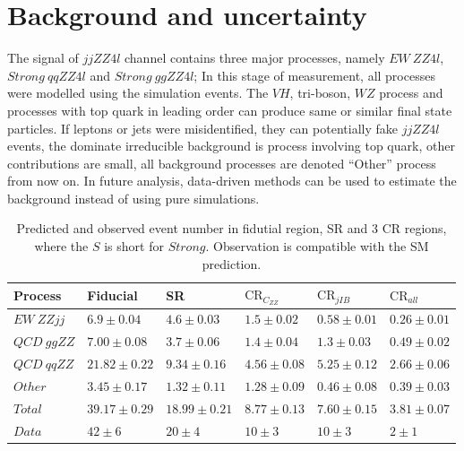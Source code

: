 \documentclass[12pt]{article}
\begin{document}
    \section{Background and uncertainty}
        \par The signal of $jjZZ4l$ channel contains three major processes, namely $EW\ ZZ4l$, $Strong\ qqZZ4l$ and $Strong\ ggZZ4l$; 
        In this stage of measurement, all processes were modelled using the simulation events. 
        The $VH$, tri-boson, $WZ$ process and processes with top quark in leading order can produce same or similar final state particles. 
        If leptons or jets were misidentified, they can potentially fake $jjZZ4l$ events, the dominate irreducible background is process 
        involving top quark, other contributions are small, all background processes are denoted ``Other'' process from now on. 
        In future analysis, data-driven methods can be used to estimate the background instead of using pure simulations.
        \begin{table}[ht!]
            \centering
            \renewcommand\arraystretch{1.2}
            \begin{tabularx}{\textwidth}{p{} p{}  p{}  p{}  p{}  p{} } 
            \hline\hline
            Process & Fiducial & SR & $\text{CR}_{C_{ZZ}}$ & $\text{CR}_{jIB}$ & $\text{CR}_{all}$\\
            \hline
            $EW\ ZZjj$ & $6.9\pm 0.04$ & $4.6\pm 0.03$ & $1.5\pm 0.02$ & $0.58\pm 0.01$ & $0.26\pm 0.01$ \\
            $QCD\ ggZZ$ & $7.00\pm 0.08$ & $3.7\pm 0.06$ & $1.4\pm 0.04$ & $1.3\pm 0.03$ & $0.49\pm 0.02$ \\
            $QCD\ qqZZ$ & $21.82\pm 0.22$ & $9.34\pm 0.16$ & $4.56\pm 0.08$ & $5.25\pm 0.12$ & $2.66\pm 0.06$\\
            $Other$ & $3.45\pm 0.17$ & $1.32\pm 0.11$ & $1.28\pm 0.09$ & $0.46\pm 0.08$ & $0.39\pm 0.03$\\
            \hline
            $Total$ & $39.17\pm 0.29$ & $18.99\pm 0.21$ & $8.77\pm 0.13$ & $7.60\pm 0.15$ & $3.81\pm 0.07$\\
            \hline
            $ Data$ & $42 \pm 6$ & $20\pm 4$ & $10\pm 3$ & $10\pm 3$ & $2\pm 1$\\
            \hline\hline
            \end{tabularx}
            \caption{Predicted and observed event number in fidutial region, SR and 3 CR regions, where the $S$ is short for $Strong$. Observation is compatible with the SM prediction. }
            \label{regevtstable}
        \end{table}
\end{document}
